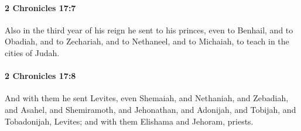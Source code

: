 		\paragraph{2 Chronicles 17:7} %
			\label{2CHRONICLES-17-7}

			Also in the third year of his reign he sent to his princes, even to Benhail, and to Obadiah, and to Zechariah, and to Nethaneel, and to Michaiah, to teach in the cities of Judah.


		\paragraph{2 Chronicles 17:8} %
			\label{2CHRONICLES-17-8}

			And with them he sent Levites, even Shemaiah, and Nethaniah, and Zebadiah, and Asahel, and Shemiramoth, and Jehonathan, and Adonijah, and Tobijah, and Tobadonijah, Levites; and with them Elishama and Jehoram, priests.


